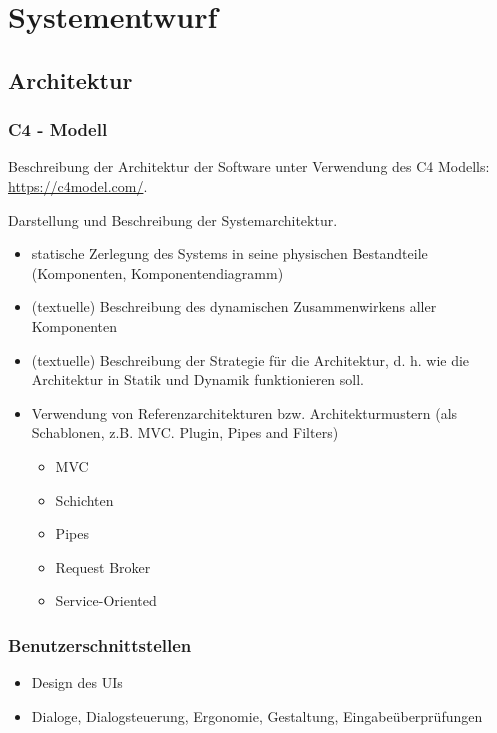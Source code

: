 \chapter{Systementwurf}

\section{Architektur}

\subsection{C4 - Modell}

Beschreibung der Architektur der Software unter Verwendung des C4 Modells: \url{https://c4model.com/}.

Darstellung und Beschreibung der Systemarchitektur.

\begin{itemize}
	\item  statische Zerlegung des Systems in seine physischen Bestandteile (Komponenten, Komponentendiagramm)
	\item (textuelle) Beschreibung des dynamischen Zusammenwirkens aller Komponenten
	\item (textuelle) Beschreibung der Strategie für die Architektur, d. h. wie die Architektur in Statik und Dynamik funktionieren soll.
	\item Verwendung von Referenzarchitekturen bzw. Architekturmustern (als Schablonen, z.B. MVC. Plugin, Pipes and Filters)
	      \begin{itemize}
		      \item MVC
		      \item Schichten
		      \item Pipes
		      \item Request Broker
		      \item Service-Oriented
	      \end{itemize}
\end{itemize}

\subsection{Benutzerschnittstellen}
\begin{itemize}
	\item Design des UIs
	\item Dialoge, Dialogsteuerung, Ergonomie, Gestaltung, Eingabeüberprüfungen
\end{itemize}

